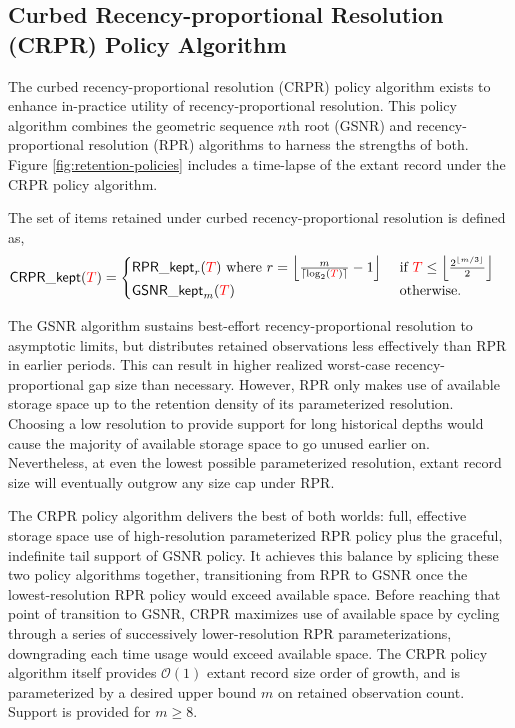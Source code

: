 \subsection{Curbed Recency-proportional Resolution (CRPR) Policy Algorithm}
\label{sec:curbed-recency-proportional-resolution-algo}

The curbed recency-proportional resolution (CRPR) policy algorithm exists to enhance in-practice utility of recency-proportional resolution.
This policy algorithm combines the geometric sequence $n$th root (GSNR) and recency-proportional resolution (RPR) algorithms to harness the strengths of both.
Figure \ref{fig:retention-policies} includes a time-lapse of the extant record under the CRPR policy algorithm.

The set of items retained under curbed recency-proportional resolution is defined as,
\begin{align}
\mathsf{CRPR\_kept}(\colorT)
&=
\begin{cases}
\mathsf{RPR\_kept}_r(\colorT)
\text{ where }
r = \left \lfloor \frac{m}{\left\lceil \log_2(\colorT) \right\rceil} - 1 \right\rfloor
 & \text{ if } \colorT \leq \left\lfloor \frac{2^{\lfloor m/3 \rfloor}}{2} \right\rfloor \\
\mathsf{GSNR\_kept}_m(\colorT)
& \text{ otherwise.}
\end{cases}
\label{eqn:crpr_kept}
\end{align}

The GSNR algorithm sustains best-effort recency-proportional resolution to asymptotic limits, but distributes retained observations less effectively than RPR in earlier periods.
This can result in higher realized worst-case recency-proportional gap size than necessary.
However, RPR only makes use of available storage space up to the retention density of its parameterized resolution.
Choosing a low resolution to provide support for long historical depths would cause the majority of available storage space to go unused earlier on.
Nevertheless, at even the lowest possible parameterized resolution, extant record size will eventually outgrow any size cap under RPR.

The CRPR policy algorithm delivers the best of both worlds: full, effective storage space use of high-resolution parameterized RPR policy plus the graceful, indefinite tail support of GSNR policy.
It achieves this balance by splicing these two policy algorithms together, transitioning from RPR to GSNR once the lowest-resolution RPR policy would exceed available space.
Before reaching that point of transition to GSNR, CRPR maximizes use of available space by cycling through a series of successively lower-resolution RPR parameterizations, downgrading each time usage would exceed available space.
The CRPR policy algorithm itself provides $\mathcal{O}(1)$ extant record size order of growth, and is parameterized by a desired upper bound $m$ on retained observation count.
Support is provided for $m \geq 8$.

